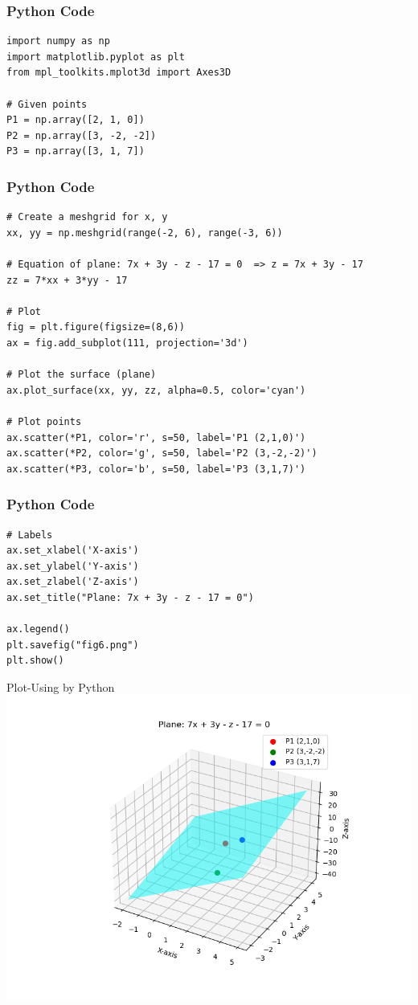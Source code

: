 \documentclass{beamer}
\begin{document}
\begin{frame}[fragile]
\frametitle{Python Code}

\begin{lstlisting}
import numpy as np
import matplotlib.pyplot as plt
from mpl_toolkits.mplot3d import Axes3D

# Given points
P1 = np.array([2, 1, 0])
P2 = np.array([3, -2, -2])
P3 = np.array([3, 1, 7])
\end{lstlisting}

\end{frame}
\begin{frame}[fragile]
\frametitle{Python  Code}

\begin{lstlisting}
# Create a meshgrid for x, y
xx, yy = np.meshgrid(range(-2, 6), range(-3, 6))

# Equation of plane: 7x + 3y - z - 17 = 0  => z = 7x + 3y - 17
zz = 7*xx + 3*yy - 17

# Plot
fig = plt.figure(figsize=(8,6))
ax = fig.add_subplot(111, projection='3d')

# Plot the surface (plane)
ax.plot_surface(xx, yy, zz, alpha=0.5, color='cyan')

# Plot points
ax.scatter(*P1, color='r', s=50, label='P1 (2,1,0)')
ax.scatter(*P2, color='g', s=50, label='P2 (3,-2,-2)')
ax.scatter(*P3, color='b', s=50, label='P3 (3,1,7)')
\end{lstlisting}

\end{frame}
\begin{frame}[fragile]
\frametitle{Python Code}

\begin{lstlisting}
# Labels
ax.set_xlabel('X-axis')
ax.set_ylabel('Y-axis')
ax.set_zlabel('Z-axis')
ax.set_title("Plane: 7x + 3y - z - 17 = 0")

ax.legend()
plt.savefig("fig6.png")
plt.show()

\end{lstlisting}

\end{frame}
\begin{frame}{Plot-Using by Python}
    \centering
    \includegraphics[width=\columnwidth, height=0.8\textheight, keepaspectratio]{figs/fig6.png}     
\end{frame}
\end{document}
